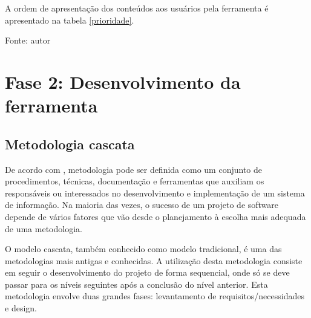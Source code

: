 A ordem de apresentação dos conteúdos aos usuários pela ferramenta é apresentado na tabela \ref{prioridade}.

\begin{table}[h]
	\centering
	\caption{Prioridade de conteúdos.}
	\label{prioridade}
	Fonte: autor
\end{table}


\section{Fase 2: Desenvolvimento da ferramenta}

\subsection{Metodologia cascata}

De acordo com , metodologia pode ser definida como um conjunto de procedimentos, técnicas, documentação e ferramentas que 
auxiliam os responsáveis ou interessados no desenvolvimento e implementação de um sistema de informação. Na maioria das vezes, o sucesso
de um projeto de software depende de vários fatores que vão desde o planejamento à escolha mais adequada de uma metodologia.

O modelo cascata, também conhecido como modelo tradicional, é uma das metodologias mais antigas e conhecidas. A utilização desta 
metodologia consiste em seguir o desenvolvimento do projeto de forma sequencial, onde só se deve passar para os níveis seguintes após
a conclusão do nível anterior. Esta metodologia envolve duas grandes fases: levantamento de requisitos/necessidades e design. \cite{semedo2012ganhos}

